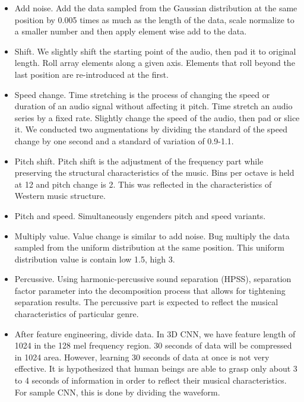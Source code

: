 \documentclass[final,3p,times,twocolumn]{elsarticle}
\begin{document}
\begin{itemize}
	\item Add noise. 
	Add the data sampled from the Gaussian distribution at the same position by 0.005 times as much as the length of the data, scale normalize to a smaller number and then apply element wise add to the data.
	
	\item Shift. We slightly shift the starting point of the audio, then pad it to original length.
	Roll array elements along a given axis.
	Elements that roll beyond the last position are re-introduced at the first.
	
	\item Speed change. 
	Time stretching is the process of changing the speed or duration of an audio signal without affecting it pitch.
	Time stretch an audio series by a fixed rate.
	Slightly change the speed of the audio, then pad or slice it.
	We conducted two augmentations by dividing the standard of the speed change by one second and a standard of variation of 0.9-1.1.
	
	\item  Pitch shift.
	Pitch shift is the adjustment of the frequency part while preserving the structural characteristics of the music.
	Bins per octave is held at 12 and pitch change is 2.
	This was reflected in the characteristics of Western music structure.
	
	\item Pitch and speed.
	Simultaneously engenders pitch and speed variants.
	
	\item Multiply value.
	Value change is similar to add noise.
	Bug multiply the data sampled from the uniform distribution at the same position.
	This uniform distribution value is contain low 1.5, high 3.
	
	\item Percussive.
	Using harmonic-percussive sound separation (HPSS), separation factor parameter into the decomposition process that allows for tightening separation results.
	The percussive part is expected to reflect the musical characteristics of particular genre.
	
	\item After feature engineering, divide data.
	In 3D CNN, we have feature length of 1024 in the 128 mel frequency region.
	30 seconds of data will be compressed in 1024 area.
	However, learning 30 seconds of data at once is not very effective.
	It is hypothesized that human beings are able to grasp only about 3 to 4 seconds of information in order to reflect their musical characteristics.
	For sample CNN, this is done by dividing the waveform.
\end{itemize}
\end{document}
